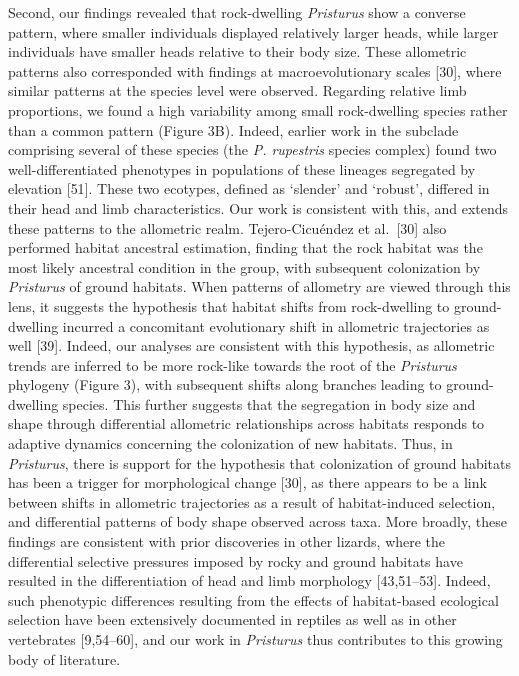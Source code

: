 \documentclass[
  11pt,
]{article}
\begin{document}
Second, our findings revealed that rock-dwelling \emph{Pristurus} show a
converse pattern, where smaller individuals displayed relatively larger
heads, while larger individuals have smaller heads relative to their
body size. These allometric patterns also corresponded with findings at
macroevolutionary scales {[}30{]}, where similar patterns at the species
level were observed. Regarding relative limb proportions, we found a
high variability among small rock-dwelling species rather than a common
pattern (Figure 3B). Indeed, earlier work in the subclade comprising
several of these species (the \emph{P. rupestris} species complex) found
two well-differentiated phenotypes in populations of these lineages
segregated by elevation {[}51{]}. These two ecotypes, defined as
`slender' and `robust', differed in their head and limb characteristics.
Our work is consistent with this, and extends these patterns to the
allometric realm. Tejero-Cicuéndez et al.~{[}30{]} also performed
habitat ancestral estimation, finding that the rock habitat was the most
likely ancestral condition in the group, with subsequent colonization by
\emph{Pristurus} of ground habitats. When patterns of allometry are
viewed through this lens, it suggests the hypothesis that habitat shifts
from rock-dwelling to ground-dwelling incurred a concomitant
evolutionary shift in allometric trajectories as well {[}39{]}. Indeed,
our analyses are consistent with this hypothesis, as allometric trends
are inferred to be more rock-like towards the root of the
\emph{Pristurus} phylogeny (Figure 3), with subsequent shifts along
branches leading to ground-dwelling species. This further suggests that
the segregation in body size and shape through differential allometric
relationships across habitats responds to adaptive dynamics concerning
the colonization of new habitats. Thus, in \emph{Pristurus}, there is
support for the hypothesis that colonization of ground habitats has been
a trigger for morphological change {[}30{]}, as there appears to be a
link between shifts in allometric trajectories as a result of
habitat-induced selection, and differential patterns of body shape
observed across taxa. More broadly, these findings are consistent with
prior discoveries in other lizards, where the differential selective
pressures imposed by rocky and ground habitats have resulted in the
differentiation of head and limb morphology {[}43,51--53{]}. Indeed,
such phenotypic differences resulting from the effects of habitat-based
ecological selection have been extensively documented in reptiles as
well as in other vertebrates {[}9,54--60{]}, and our work in
\emph{Pristurus} thus contributes to this growing body of literature.
\hfill\break
\end{document}
